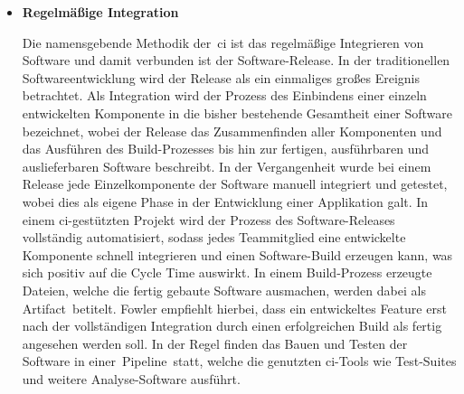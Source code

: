 \begin{itemize}
    \item {
        \textbf{Regelmäßige Integration}\par
        Die namensgebende Methodik der\ \acrshort{ci} ist das regelmäßige Integrieren von Software und damit verbunden
        ist der Software-Release.
        In der traditionellen Softwareentwicklung wird der Release als ein einmaliges großes Ereignis betrachtet.
        Als Integration wird der Prozess des Einbindens einer einzeln entwickelten Komponente in die bisher bestehende
        Gesamtheit einer Software bezeichnet, wobei der Release das Zusammenfinden aller Komponenten und das Ausführen
        des Build-Prozesses bis hin zur fertigen, ausführbaren und auslieferbaren Software beschreibt.
        In der Vergangenheit wurde bei einem Release jede Einzelkomponente der Software manuell integriert und getestet,
        wobei dies als eigene Phase in der Entwicklung einer Applikation galt.
        In einem \acrshort{ci}-gestützten Projekt wird der Prozess des Software-Releases vollständig automatisiert,
        sodass jedes Teammitglied eine entwickelte Komponente schnell integrieren und einen Software-Build erzeugen
        kann, was sich positiv auf die Cycle Time auswirkt.
        In einem Build-Prozess erzeugte Dateien, welche die fertig gebaute Software ausmachen, werden dabei als\ \glqq
        Artifact\grqq\ betitelt.
        Fowler empfiehlt hierbei, dass ein entwickeltes Feature erst nach der vollständigen Integration durch einen
        erfolgreichen Build als fertig angesehen werden soll.
        In der Regel finden das Bauen und Testen der Software in einer\ \glqq Pipeline\grqq\ statt, welche die genutzten
        \acrshort{ci}-Tools wie Test-Suites und weitere Analyse-Software ausführt.
    }


\end{itemize}
